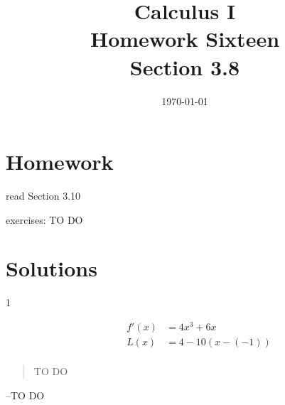 \documentclass[letterpaper, landscape]{exam}
\title{Calculus I \\ Homework Sixteen \\ Section 3.8}
\author{}
\date{\today}
\begin{document}
  \maketitle

  \section{Homework}
    \begin{itemize*}
      \item read Section 3.10
      \item exercises: TO DO
    \end{itemize*}

  \ifprintanswers

  \section{Solutions}

  \begin{description}
    \item[1] 
      \begin{align*}
        f'(x) &= 4x^3 + 6x \\
      L(x) &= 4 -10(x - (-1)) \\
      \end{align*}

  \end{description}

  \else
    \vspace{10 cm}
    \begin{quote}
      \begin{em}
        TO DO
      \end{em}
    \end{quote}
    \hspace{2 cm} --TO DO
  \fi
\end{document}
